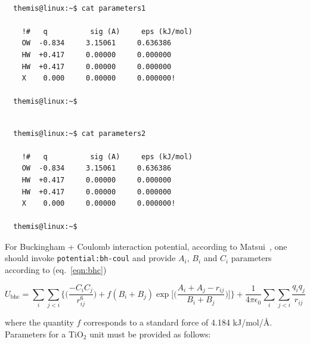 \documentclass[10pt,a4paper]{report}
\begin{document}
\begin{center}
  \begin{minipage}{0.45\textwidth}
    \vskip0.25cm
    \begin{verbatim}

  themis@linux:~$ cat parameters1

    !#   q          sig (A)     eps (kJ/mol)
    OW  -0.834     3.15061     0.636386
    HW  +0.417     0.00000     0.000000	 
    HW  +0.417     0.00000     0.000000	 
    X    0.000     0.00000     0.000000!

  themis@linux:~$

    \end{verbatim}
  \end{minipage}%
%
  \hskip0.5cm
%
  \begin{minipage}{0.45\textwidth}
    \vskip0.25cm
    \begin{verbatim}

  themis@linux:~$ cat parameters2

    !#   q          sig (A)     eps (kJ/mol)
    OW  -0.834     3.15061     0.636386
    HW  +0.417     0.00000     0.000000	 
    HW  +0.417     0.00000     0.000000	 
    X    0.000     0.00000     0.000000!

  themis@linux:~$

    \end{verbatim}
  \end{minipage}%
\end{center}

  For Buckingham + Coulomb interaction potential, according to
Matsui~\cite{matsui}, one should invoke \texttt{potential:bh-coul} 
and provide $A_{i}$, $B_{i}$ and $C_{i}$ parameters according to (eq.~\ref{eqn:bhc})

\begin{equation}
  \label{eqn:bhc}
  U_{\textrm{bhc}} =  
  \sum\limits_{i}
  \sum\limits_{j<i}\bigg\{\bigg(\frac{-C_{i}C_{j}}{r_{ij}^{6}}\bigg)
  + f(B_{i}+B_{j})
\exp\bigg[\bigg(\frac{A_{i}+A_{j}-r_{ij}}{B_{i}+B_{j}}\bigg)\bigg]\bigg\}
	+\frac{1}{4\pi\epsilon_{0}}\sum\limits_{i} \sum\limits_{j<i}\frac{q_{i}q_{j}}{r_{ij}}
\end{equation}

where the quantity $f$ corresponds to a standard force of 4.184 kJ/mol/\AA. Parameters 
for a TiO$_{2}$ unit must be provided as follows:
\end{document}
